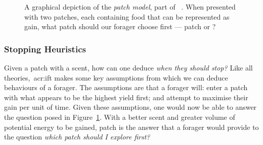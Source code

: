 \begin{figure}[t!]
    \centering
    \caption[The patch model]{A graphical depiction of the \emph{patch model}, part of ~. When presented with two patches, each containing food that can be represented as gain, what patch should our forager choose first — patch  or ?}
    \label{fig:patch_model}
\end{figure}

\subsubsection{Stopping Heuristics}\label{sec:stopping_background:theoretical:ift:stopping}
Given a patch with a scent, how can one deduce \emph{when they should stop?} Like all theories,~\gls{acr:ift} makes some key assumptions from which we can deduce behaviours of a forager. The assumptions are that a forager will: enter a patch with what appears to be the highest yield first; and attempt to maximise their gain per unit of time. Given these assumptions, one would now be able to answer the question posed in Figure~\ref{fig:patch_model}. With a better scent and greater volume of potential energy to be gained, patch  is the answer that a forager would provide to the question \emph{which patch should I explore first?}

